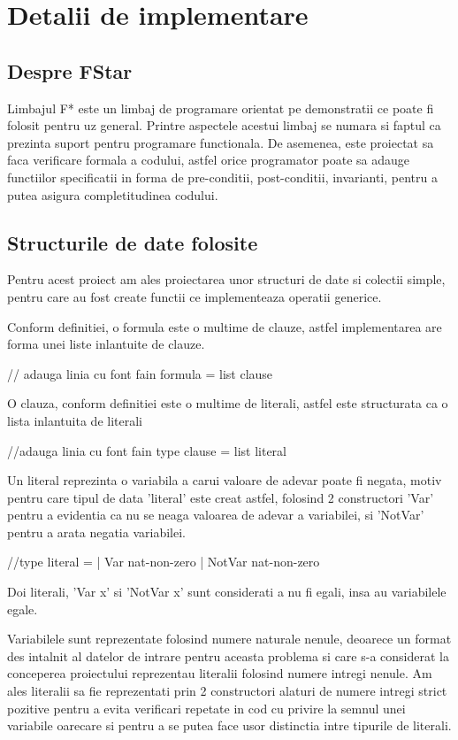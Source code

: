 \chapter{Detalii de implementare}


\section{Despre FStar}

Limbajul F* este un limbaj de programare orientat pe demonstratii ce poate fi folosit pentru uz general. Printre aspectele acestui limbaj se numara si faptul ca prezinta suport pentru programare functionala. De asemenea, este proiectat sa faca verificare formala a codului, astfel orice programator poate sa adauge functiilor specificatii in forma de pre-conditii, post-conditii, invarianti, pentru a putea asigura completitudinea codului.

\section{Structurile de date folosite}

Pentru acest proiect am ales proiectarea unor structuri de date si colectii simple, pentru care au fost create functii ce implementeaza operatii generice.

Conform definitiei, o formula este o multime de clauze, astfel implementarea are forma unei liste inlantuite de clauze.

// adauga linia cu font fain formula = list clause

O clauza, conform definitiei este o multime de literali, astfel este structurata ca o lista inlantuita de literali

//adauga linia cu font fain type clause = list literal

\newpage

Un literal reprezinta o variabila a carui valoare de adevar poate fi negata, motiv pentru care tipul de data 'literal' este creat astfel, folosind 2 constructori 'Var' pentru a evidentia ca nu se neaga valoarea de adevar a variabilei, si 'NotVar' pentru a arata negatia variabilei.

//type literal = 
	| Var nat-non-zero
	| NotVar nat-non-zero
	
Doi literali, 'Var x' si 'NotVar x' sunt considerati a nu fi egali, insa au variabilele egale.
	
Variabilele sunt reprezentate folosind numere naturale nenule, deoarece un format des intalnit al datelor de intrare pentru aceasta problema si care s-a considerat la conceperea proiectului reprezentau literalii folosind numere intregi nenule. Am ales literalii sa fie reprezentati prin 2 constructori alaturi de numere intregi strict pozitive pentru a evita verificari repetate in cod cu privire la semnul unei variabile oarecare si pentru a se putea face usor distinctia intre tipurile de literali.

